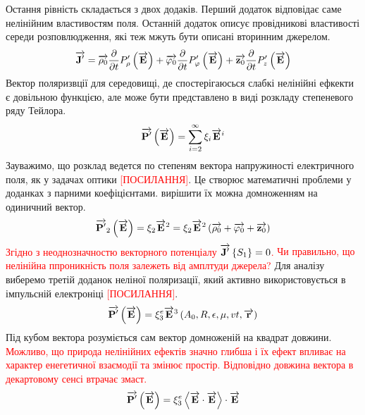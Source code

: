 Остання рівність складається з двох додаків. Перший додаток відповідає саме 
нелінійним властивостям поля. Останній додаток описує провідникові властивості 
середи розповлюдження, які теж мжуть бути описані вторинним джерелом. 
%
\begin{equation*} 
\overrightarrow{\mathbf J^\prime} = 
\overrightarrow{\mathbf \rho_0}    \frac{\partial }{\partial t} P_\rho^\prime    \left( \overrightarrow{\mathbf E} \right) + 
\overrightarrow{\mathbf \varphi_0} \frac{\partial }{\partial t} P_\varphi^\prime \left( \overrightarrow{\mathbf E} \right) + 
\overrightarrow{\mathbf z_0}       \frac{\partial }{\partial t} P_z^\prime       \left( \overrightarrow{\mathbf E} \right) 
\end{equation*}
%
Вектор поляризвції для середовищі, де спостерігаюсься слабкі нелінійні ефкекти 
є довільною функцією, але може бути представлено в виді розкладу степеневого 
ряду Тейлора. 
%
\begin{equation*} \begin{aligned}
\overrightarrow{\mathbf P^\prime} \left( \overrightarrow{\mathbf E} \right) = \sum_{i=2}^{\infty} \xi_i \overrightarrow{\mathbf E}^i
\end{aligned} \end{equation*}
%
Зауважимо, що розклад ведется по степеням вектора напружиності 
електричного поля, як у задачах оптики \textcolor{red}{[ПОСИЛАННЯ]}. 
Це створює математичні проблеми у доданках з парними коефіцієнтами.
вирішити їх можна домноженням на одиничний вектор.
%
\begin{equation*} \begin{aligned}
\overrightarrow{\mathbf P^\prime}_2 \left( \overrightarrow{\mathbf E} \right) = \xi_2 \overrightarrow{\mathbf E}^2 = 
\xi_2 \overrightarrow{\mathbf E}^2 \left( \overrightarrow{\mathbf \rho_0}  + \overrightarrow{\mathbf \varphi_0} + \overrightarrow{\mathbf z_0} \right)
\end{aligned} \end{equation*}
%
\textcolor{red}{ Згідно з неоднозначностю векторного потенціалу 
\cite[ст. 77]{imp:LandauII} $ \overrightarrow{\mathbf J^\prime} \left\{ S_1 \right\}  = 0 $. }
%
\textcolor{red}{ Чи правильно, що нелінійна ппроникність поля залежеть від 
амплтуди джерела? }
%
Для аналізу виберемо третій доданок неліної поляризації, який активно 
використовується в імпульсній електроніці \textcolor{red}{[ПОСИЛАННЯ]}.
%
\begin{equation*}
\overrightarrow{\mathbf P^\prime} \left( \overrightarrow{\mathbf E} \right) = 
\xi_3^e \overrightarrow{\mathbf E}^3 
\left( A_0, R, \epsilon, \mu, vt, \overrightarrow{\mathbf r} \right)
\end{equation*}
%
Під кубом вектора розуміється сам вектор домноженій на квадрат довжини.
\textcolor{red}{ Можливо, що природа нелінійних ефектів значно глибша і 
їх ефект впливає на характер енегетичної взаємодії та змінює простір.
Відповідно довжина вектора в декартовому сенсі втрачає змаст. }
%
\begin{equation*}
\overrightarrow{\mathbf P^\prime} \left( \overrightarrow{\mathbf E} \right) = 
\xi_3^e \left<  \overrightarrow{\mathbf E}  \cdot  \overrightarrow{\mathbf E}  \right> \cdot \overrightarrow{\mathbf E} 
\end{equation*}
